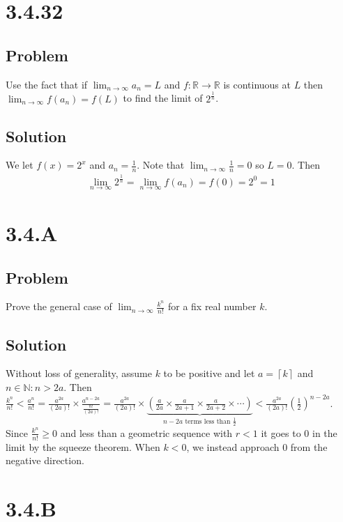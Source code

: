 \documentclass[12pt]{article}
\newcommand{\round}[1]{\left(       #1 \right)      }
\newcommand{\ceil} [1]{\left\lceil  #1 \right\rceil }
\newcommand{\R}    [0]{\mathbb{R}                   }
\newcommand{\N}    [0]{\mathbb{N}                   }
\begin{document}
\section*{3.4.32}

\subsection*{Problem}
Use the fact that if $\lim_{n \to \infty} a_n = L$ and $f : \R \to \R$ is continuous at $L$ then $\lim_{n \to \infty} f(a_n) = f(L)$ to find the limit of $2^\frac{1}{n}$.

\subsection*{Solution}
We let $f(x) = 2^x$ and $a_n = \frac{1}{n}$. Note that $\lim_{n\to\infty} \frac{1}{n} = 0$ so $L = 0$. Then
\begin{align*}
    \lim_{n\to\infty} 2^\frac{1}{n} = \lim_{n\to\infty} f(a_n) = f(0) = 2^0 = 1
\end{align*}



\section*{3.4.A}

\subsection*{Problem}
Prove the general case of $\lim_{n \to \infty} \frac{k^n}{n!}$ for a fix real number $k$.

\subsection*{Solution}
Without loss of generality, assume $k$ to be positive and let $a = \ceil{k}$ and $n \in \N : n > 2a$. Then $\frac{k^n}{n!} < \frac{a^n}{n!} = \frac{a^{2a}}{(2a)!} \times \frac{a^{n-2a}}{\frac{n!}{(2a)!}} = \frac{a^{2a}}{(2a)!} \times \underbrace{\round{\frac{a}{2a} \times \frac{a}{2a+1} \times \frac{a}{2a+2} \times \cdots}}_{n-2a \text{ terms less than } \frac{1}{2}} < \frac{a^{2a}}{(2a)!} \round{\frac{1}{2}}^{n-2a}$. Since $\frac{k^n}{n!} \geq 0$ and less than a geometric sequence with $r < 1$ it goes to 0 in the limit by the squeeze theorem. When $k < 0$, we instead approach 0 from the negative direction.



\section*{3.4.B}
\end{document}
